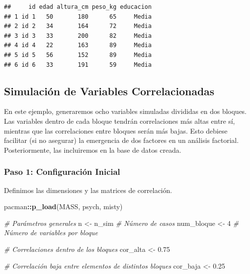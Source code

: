 \documentclass[
]{book}
\newenvironment{Shaded}{\begin{snugshade}}{\end{snugshade}}
\newcommand{\CommentTok}[1]{\textcolor[rgb]{0.56,0.35,0.01}{\textit{#1}}}
\newcommand{\DecValTok}[1]{\textcolor[rgb]{0.00,0.00,0.81}{#1}}
\newcommand{\FloatTok}[1]{\textcolor[rgb]{0.00,0.00,0.81}{#1}}
\newcommand{\FunctionTok}[1]{\textcolor[rgb]{0.13,0.29,0.53}{\textbf{#1}}}
\newcommand{\NormalTok}[1]{#1}
\newcommand{\OtherTok}[1]{\textcolor[rgb]{0.56,0.35,0.01}{#1}}
\newcommand{\SpecialCharTok}[1]{\textcolor[rgb]{0.81,0.36,0.00}{\textbf{#1}}}
\begin{document}
\begin{verbatim}
##     id edad altura_cm peso_kg educacion
## 1 id 1   50       180      65     Media
## 2 id 2   34       164      72     Media
## 3 id 3   33       200      82     Media
## 4 id 4   22       163      89     Media
## 5 id 5   56       152      89     Media
## 6 id 6   33       191      59     Media
\end{verbatim}

\hypertarget{simulaciuxf3n-de-variables-correlacionadas}{%
\subsection{Simulación de Variables Correlacionadas}\label{simulaciuxf3n-de-variables-correlacionadas}}

En este ejemplo, generaremos ocho variables simuladas divididas en dos bloques. Las variables dentro de cada bloque tendrán correlaciones más altas entre sí, mientras que las correlaciones entre bloques serán más bajas. Esto debiese facilitar (si no asegurar) la emergencia de dos factores en un análisis factorial. Posteriormente, las incluiremos en la base de datos creada.

\hypertarget{paso-1-configuraciuxf3n-inicial}{%
\subsubsection{Paso 1: Configuración Inicial}\label{paso-1-configuraciuxf3n-inicial}}

Definimos las dimensiones y las matrices de correlación.

\begin{Shaded}
\begin{Highlighting}[]
\NormalTok{pacman}\SpecialCharTok{::}\FunctionTok{p\_load}\NormalTok{(MASS, psych, misty)}

\CommentTok{\# Parámetros generales}
\NormalTok{n }\OtherTok{\textless{}{-}}\NormalTok{ n\_sim  }\CommentTok{\# Número de casos}
\NormalTok{num\_bloque }\OtherTok{\textless{}{-}} \DecValTok{4}  \CommentTok{\# Número de variables por bloque}

\CommentTok{\# Correlaciones dentro de los bloques}
\NormalTok{cor\_alta }\OtherTok{\textless{}{-}} \FloatTok{0.75}

\CommentTok{\# Correlación baja entre elementos de distintos bloques}
\NormalTok{cor\_baja }\OtherTok{\textless{}{-}} \FloatTok{0.25}
\end{Highlighting}
\end{Shaded}
\end{document}
